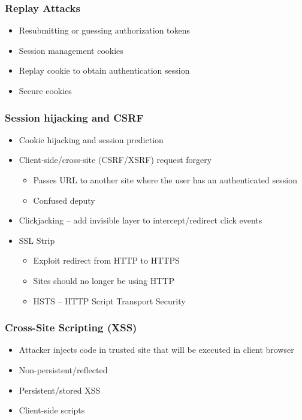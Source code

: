 		\subsubsection {Replay Attacks}
			\begin{itemize}
				\item Resubmitting or guessing authorization tokens
				\item Session management cookies
				\item Replay cookie to obtain authentication session
				\item Secure cookies
			\end{itemize}
		\subsubsection {Session hijacking and CSRF}
			\begin{itemize}
				\item Cookie hijacking and session prediction
				\item Client-side/cross-site (CSRF/XSRF) request forgery
					\begin{itemize}
						\item Passes URL to another site where the user has an
							authenticated session
						\item Confused deputy
					\end{itemize}
				\item Clickjacking -- add invisible layer to intercept/redirect
					click events
				\item SSL Strip
					\begin{itemize}
						\item Exploit redirect from HTTP to HTTPS
						\item Sites should no longer be using HTTP
						\item HSTS -- HTTP Script Transport Security
					\end{itemize}
			\end{itemize}
		\subsubsection {Cross-Site Scripting (XSS)}
			\begin{itemize}
				\item Attacker injects code in trusted site that will be executed
					in client browser
				\item Non-persistent/reflected
				\item Persistent/stored XSS
				\item Client-side scripts
			\end{itemize}
